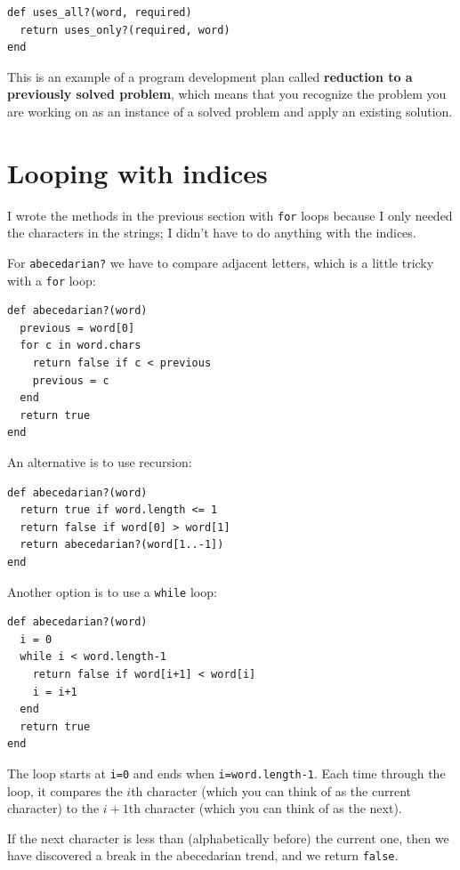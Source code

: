 \documentclass[10pt]{book}
\begin{document}
\begin{verbatim}
def uses_all?(word, required)
  return uses_only?(required, word)
end
\end{verbatim}
%
This is an example of a program development plan called
{\bf reduction to a previously solved problem}, which means that you
recognize the problem you are working on as an instance of a solved
problem and apply an existing solution.


\section{Looping with indices}

I wrote the methods in the previous section with {\tt for}
loops because I only needed the characters in the strings; I didn't
have to do anything with the indices.

For \verb"abecedarian?" we have to compare adjacent letters,
which is a little tricky with a {\tt for} loop:

\begin{verbatim}
def abecedarian?(word)
  previous = word[0]
  for c in word.chars
    return false if c < previous
    previous = c
  end
  return true
end
\end{verbatim}

An alternative is to use recursion:

\begin{verbatim}
def abecedarian?(word)
  return true if word.length <= 1
  return false if word[0] > word[1]
  return abecedarian?(word[1..-1])
end
\end{verbatim}

Another option is to use a {\tt while} loop:

\begin{verbatim}
def abecedarian?(word)
  i = 0
  while i < word.length-1
    return false if word[i+1] < word[i]
    i = i+1
  end
  return true
end
\end{verbatim}
%
The loop starts at {\tt i=0} and ends when {\tt i=word.length-1}.  Each
time through the loop, it compares the $i$th character (which you can
think of as the current character) to the $i+1$th character (which you
can think of as the next).

If the next character is less than (alphabetically before) the current
one, then we have discovered a break in the abecedarian trend, and
we return {\tt false}.
\end{document}
